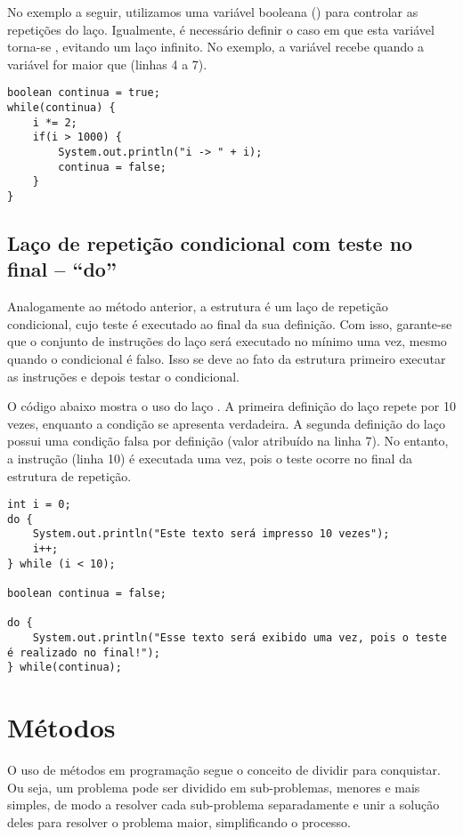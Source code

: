 No exemplo a seguir, utilizamos uma variável booleana () para controlar as repetições do laço. Igualmente, é necessário definir o caso em que esta variável torna-se , evitando um laço infinito. No exemplo, a variável recebe  quando a variável  for maior que  (linhas 4 a 7). 

\begin{verbatim}
boolean continua = true;
while(continua) {
	i *= 2;
	if(i > 1000) {
		System.out.println("i -> " + i);
		continua = false;
	}
}
\end{verbatim}

\subsection{Laço de repetição condicional com teste no final -- ``do''}
Analogamente ao método anterior, a estrutura  é um laço de repetição condicional, cujo teste é executado ao final da sua definição. Com isso, garante-se que o conjunto de instruções do laço será executado no mínimo uma vez, mesmo quando o condicional é falso. Isso se deve ao fato da estrutura primeiro executar as instruções e depois testar o condicional.

O código abaixo mostra o uso do laço . A primeira definição do laço repete por 10 vezes, enquanto a condição  se apresenta verdadeira. A segunda definição do laço possui uma condição falsa por definição (valor atribuído na linha 7). No entanto, a instrução (linha 10) é executada uma vez, pois o teste ocorre no final da estrutura de repetição.


\begin{verbatim}
int i = 0;
do {
	System.out.println("Este texto será impresso 10 vezes");
	i++;
} while (i < 10);

boolean continua = false;

do {
	System.out.println("Esse texto será exibido uma vez, pois o teste é realizado no final!");
} while(continua);
\end{verbatim}

\section{Métodos}
O uso de métodos em programação segue o conceito de dividir para conquistar. Ou seja, um problema pode ser dividido em sub-problemas, menores e mais simples, de modo a resolver cada sub-problema separadamente e unir a solução deles para resolver o problema maior, simplificando o processo.

